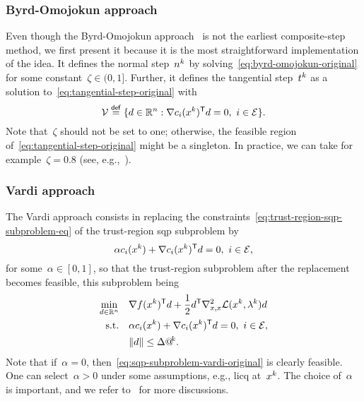 \subsubsection{Byrd-Omojokun approach}

Even though the Byrd-Omojokun approach~\cite{Byrd_1987,Omojokun_1989} is not the earliest composite-step method, we first present it because it is the most straightforward implementation of the idea.
It defines the normal step~$\nstep[k]$ by solving~\cref{eq:byrd-omojokun-original} for some constant~$\zeta \in (0, 1]$\nomenclature[Sd]{$(a, b]$}{Semi-open set~$\set{\iter \in \R : a < \iter \le b}$ with~$a < b$}.
Further, it defines the tangential step~$\tstep[k]$ as a solution to~\cref{eq:tangential-step-original} with
\begin{equation}
    \label{eq:tangential-subproblem-feasible-set}
    \mathcal{V} \eqdef \set{\step \in \R^n : \nabla \con{i}(\iter[k])^{\T} \step = 0, ~ i \in \ieq}.
\end{equation}
Note that~$\zeta$ should not be set to one; otherwise, the feasible region of~\cref{eq:tangential-step-original} might be a singleton.
In practice, we can take for example~$\zeta = 0.8$ (see, e.g.,~\cite[Eq.~(18.45)]{Nocedal_Wright_2006}).

\subsubsection{Vardi approach}

The Vardi approach consists in replacing the constraints~\cref{eq:trust-region-sqp-subproblem-eq} of the trust-region \gls{sqp} subproblem by
\begin{equation}
    \label{eq:vardi-original}
    \alpha \con{i}(\iter[k]) + \nabla \con{i}(\iter[k])^{\T} \step = 0, ~ i \in \ieq,
\end{equation}
for some~$\alpha \in [0, 1]$, so that the trust-region subproblem after the replacement becomes feasible, this subproblem being
\begin{subequations}
    \label{eq:sqp-subproblem-vardi-original}
    \begin{align}
        \min_{\step \in \R^n}   & \quad \nabla \obj(\iter[k])^{\T} \step + \frac{1}{2} \step^{\T} \nabla_{x, x}^2 \lag(\iter[k], \lm[k]) \step\\
        \text{s.t.}             & \quad \alpha \con{i}(\iter[k]) + \nabla \con{i}(\iter[k])^{\T} \step = 0, ~ i \in \ieq,\\
                                & \quad \norm{\step} \le \rad[k].
    \end{align}
\end{subequations}
Note that if~$\alpha = 0$, then~\cref{eq:sqp-subproblem-vardi-original} is clearly feasible.
One can select~$\alpha > 0$ under some assumptions, e.g., \gls{licq} at~$\iter[k]$.
The choice of~$\alpha$ is important, and we refer to~\cite[\S~15.4.1]{Conn_Gould_Toint_2000} for more discussions.


